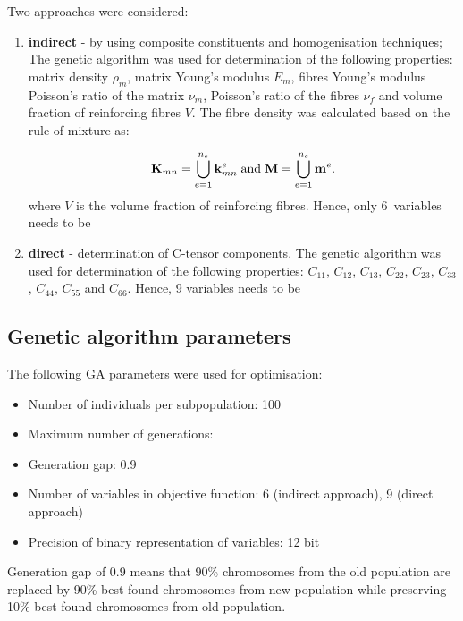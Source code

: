 	Two approaches were considered:
	\begin{enumerate}
		\item \textbf{indirect} - by using composite constituents and homogenisation techniques;
		The genetic algorithm was used for determination of the following properties:  
		matrix density \(\rho_m\), matrix Young's modulus \(E_m\), fibres Young's modulus 
		 Poisson's ratio of the matrix \(\nu_m\), Poisson's ratio of the 
		fibres \(\nu_f\) and volume fraction of reinforcing fibres \(V\).  The fibre density was 
		calculated based on the rule of mixture as:
		
\begin{equation}
 	\mathbf{K}_{mn}= \bigcup_{e=1}^{n_e} \mathbf{k}_{mn}^{e} \; \textrm{and} \; \mathbf{M}= \bigcup_{e=1}^{n_e} \mathbf{m}^{e}. 
 	\end{equation}
		where \(V\) is the volume fraction of reinforcing fibres. Hence, only 6~variables 
		needs to be  
		\item \textbf{direct} - determination of C-tensor components.
		The genetic algorithm was used for determination of the following properties: 
		\(C_{11}\), \(C_{12}\), \(C_{13}\),  \(C_{22}\), \(C_{23}\), \(C_{33}\), \(C_{44}\), 
		\(C_{55}\) and \(C_{66}\). Hence, 9 variables needs to be  
	\end{enumerate}

	
\subsection{Genetic algorithm parameters}
	
	The following GA parameters were used for optimisation:
	\begin{itemize}
		\item Number of individuals per subpopulation: 100
		\item Maximum number of generations:  
		\item Generation gap: 0.9
		\item Number of variables in objective function: 6 (indirect approach), 9 (direct approach)
		\item Precision of binary representation of variables: 12 bit
   \end{itemize}
    Generation gap of 0.9 means that 90\% chromosomes from the old population are replaced by 90\% best found chromosomes from new population while preserving 10\% best found chromosomes from old population.
    
